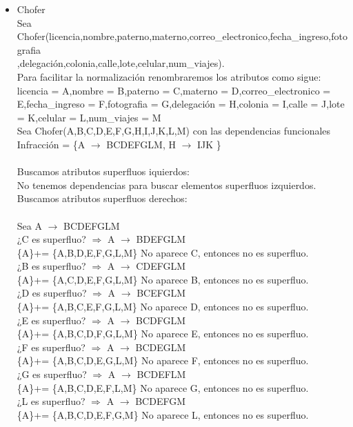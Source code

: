 \documentclass{article}
\begin{document}
\begin{itemize}
\item Chofer\\
Sea Chofer(licencia,nombre,paterno,materno,correo\_electronico,fecha\_ingreso,fotografia\\,delegación,colonia,calle,lote,celular,num\_viajes).\\
Para facilitar la normalización renombraremos los atributos como sigue:
licencia = A,nombre = B,paterno = C,materno = D,correo\_electronico = E,fecha\_ingreso = F,fotografia = G,delegación = H,colonia = I,calle = J,lote = K,celular = L,num\_viajes = M\\
Sea Chofer(A,B,C,D,E,F,G,H,I,J,K,L,M) con las dependencias funcionales 
Infracción = \{A $\rightarrow$ BCDEFGLM, H $\rightarrow$ IJK  \} \\
\\
Buscamos atributos superfluos iquierdos:\\
No tenemos dependencias para buscar elementos superfluos izquierdos.\\
Buscamos atributos superfluos derechos:\\
\\
Sea A $\rightarrow$ BCDEFGLM\\
¿C es superfluo? $\Rightarrow$ A $\rightarrow$ BDEFGLM \\
\{A\}+= \{A,B,D,E,F,G,L,M\} No aparece C, entonces no es superfluo.\\
¿B es superfluo? $\Rightarrow$ A $\rightarrow$ CDEFGLM \\
\{A\}+= \{A,C,D,E,F,G,L,M\} No aparece B, entonces no es superfluo.\\
¿D es superfluo? $\Rightarrow$ A $\rightarrow$ BCEFGLM \\
\{A\}+= \{A,B,C,E,F,G,L,M\}  No aparece D, entonces no es superfluo.\\
¿E es superfluo? $\Rightarrow$ A $\rightarrow$ BCDFGLM \\
\{A\}+= \{A,B,C,D,F,G,L,M\}  No aparece E, entonces no es superfluo.\\
¿F es superfluo? $\Rightarrow$ A $\rightarrow$ BCDEGLM \\
\{A\}+= \{A,B,C,D,E,G,L,M\}  No aparece F, entonces no es superfluo.\\
¿G es superfluo? $\Rightarrow$ A $\rightarrow$ BCDEFLM \\
\{A\}+= \{A,B,C,D,E,F,L,M\}  No aparece G, entonces no es superfluo.\\
¿L es superfluo? $\Rightarrow$ A $\rightarrow$ BCDEFGM \\
\{A\}+= \{A,B,C,D,E,F,G,M\}  No aparece L, entonces no es superfluo.\\

\end{itemize}
\end{document}

